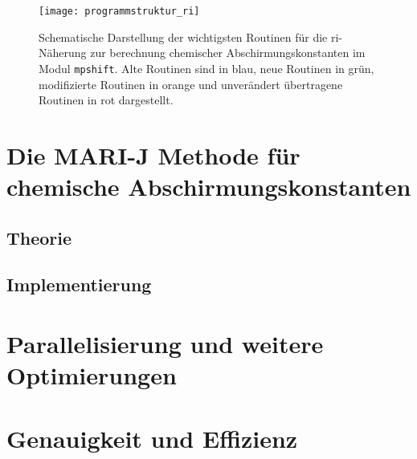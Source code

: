 \begin{figure}[ht!]
\centering
\texttt{[image: programmstruktur\_ri]}
\captionsetup{figurewithin = chapter}
\captionsetup{font=small, labelfont=bf}\caption[RI-J Routinen für chemische Abschirmungskonstanten]{Schematische Darstellung der wichtigsten Routinen für die \ac{ri}-Näherung zur berechnung chemischer Abschirmungskonstanten im Modul \texttt{mpshift}. Alte Routinen sind in blau, neue Routinen in grün, modifizierte Routinen in orange und unverändert übertragene Routinen in rot dargestellt.}
\label{abb:programmstrukur_ri}
\end{figure}

\section{Die MARI-J Methode für chemische Abschirmungskonstanten}\label{marij}
	\subsection{Theorie}
	\subsection{Implementierung}
	
\section{Parallelisierung und weitere Optimierungen}\label{paraopt}

\section{Genauigkeit und Effizienz}\label{genauigkeit}